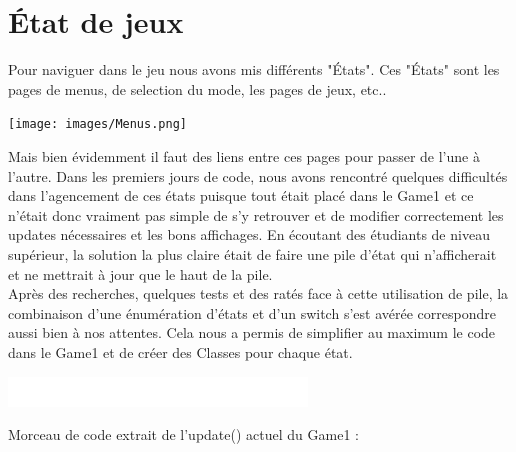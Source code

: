 \documentclass [11pt]{report}
\begin{document}
		\vspace{4mm}
		
		
		
		\newpage
		
		
		\section{\'Etat de jeux}
		
		\vspace{5mm}
		
		Pour naviguer dans le jeu nous avons mis différents "États". Ces "États" sont les pages de menus, de selection du mode, les pages de jeux, etc.. 
		
		\vspace{8mm}
		
		\begin{center}
			\texttt{[image: images/Menus.png]}
		\end{center}
		
		
		\vspace{10mm}
			 
			 
		
		Mais bien évidemment il faut des liens entre ces pages pour passer de l'une à l'autre. Dans les premiers jours de code, nous avons rencontré quelques difficultés dans l'agencement de ces états puisque tout était placé dans le Game1 et ce n'était donc vraiment pas simple de s'y retrouver et de modifier correctement les updates nécessaires et les bons affichages. En écoutant des étudiants de niveau supérieur, la solution la plus claire était de faire une pile d'état qui n'afficherait et ne mettrait à jour que le haut de la pile.\\
		
		Après des recherches, quelques tests et des ratés face à cette utilisation de pile, la combinaison d'une énumération d'états et d'un switch s'est avérée correspondre aussi bien à nos attentes. Cela nous a permis de simplifier au maximum le code dans le Game1 et de créer des Classes pour chaque état.\\
				
		\newpage	
			\begin{center}
						\includegraphics[scale = 0.3]{images/blanc.png}
					\end{center}
		\noindent Morceau de code extrait de l'update() actuel du Game1 :
		
\end{document}
